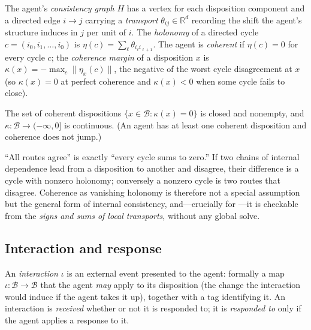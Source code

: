 \documentclass[11pt,twocolumn,a4paper]{article}
\newcommand{\R}{\mathbb{R}}
\newcommand{\Beh}{\mathcal{B}}       %
\newcommand{\Int}{\iota}             %
\newcommand{\coh}{\kappa}            %
\newcommand{\norm}[1]{\lVert#1\rVert}
\begin{document}
\begin{definition}
\label{def:coherence}
The agent's \emph{consistency graph} $H$ has a vertex for each disposition
component and a directed edge $i\to j$ carrying a \emph{transport}
$\theta_{ij}\in\R^d$ recording the shift the agent's structure induces in
$j$ per unit of $i$. The \emph{holonomy} of a directed cycle
$c=(i_0,i_1,\dots,i_0)$ is $\eta(c)=\sum_\ell\theta_{i_\ell i_{\ell+1}}$.
The agent is \emph{coherent} if $\eta(c)=0$ for every cycle $c$; the
\emph{coherence margin} of a disposition $x$ is
$\coh(x)=-\max_c\norm{\eta_x(c)}$, the negative of the worst cycle
disagreement at $x$ (so $\coh(x)=0$ at perfect coherence and $\coh(x)<0$
when some cycle fails to close).
\end{definition}

\begin{axiom}
\label{ax:closed}
The set of coherent dispositions $\{x\in\Beh:\coh(x)=0\}$ is closed and
nonempty, and $\coh:\Beh\to(-\infty,0]$ is continuous. (An agent has at
least one coherent disposition and coherence does not jump.)
\end{axiom}

\begin{remark}
\label{rem:holonomy}
``All routes agree'' is exactly ``every cycle sums to zero.'' If two chains
of internal dependence lead from a disposition to another and disagree,
their difference is a cycle with nonzero holonomy; conversely a nonzero
cycle is two routes that disagree. Coherence as vanishing holonomy is
therefore not a special assumption but the general form of internal
consistency, and---crucially for ---it is checkable
from the \emph{signs and sums of local transports}, without any global
solve.
\end{remark}

\subsection{Interaction and response}

\begin{definition}[Interaction]
\label{def:interaction}
An \emph{interaction} $\Int$ is an external event presented to the agent:
formally a map $\Int:\Beh\to\Beh$ that the agent \emph{may} apply to its
disposition (the change the interaction would induce if the agent takes it
up), together with a tag identifying it. An interaction is \emph{received}
whether or not it is responded to; it is \emph{responded to} only if the
agent applies a response to it.
\end{definition}
\end{document}
